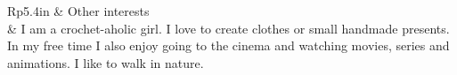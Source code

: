 \documentclass[letterpaper, 11pt]{article}
\newcommand{\headingfont}{\Large\color{OliveGreen}}
\newenvironment{SectionTable}[1]{
	\renewcommand*{\arraystretch}{1.7}
	\setlength{\tabcolsep}{10pt}
	\begin{longtable}{Rp{5.4in}} & #1 \\}
{\end{longtable}\vspace{-.3cm}}
\begin{document}
\begin{SectionTable}{\headingfont Other interests}
& I am a crochet-aholic girl. I love to create clothes or small handmade presents. In my free time I also enjoy going to the cinema and watching movies, series and animations. I like to walk in nature. 
\end{SectionTable}

\end{document}
